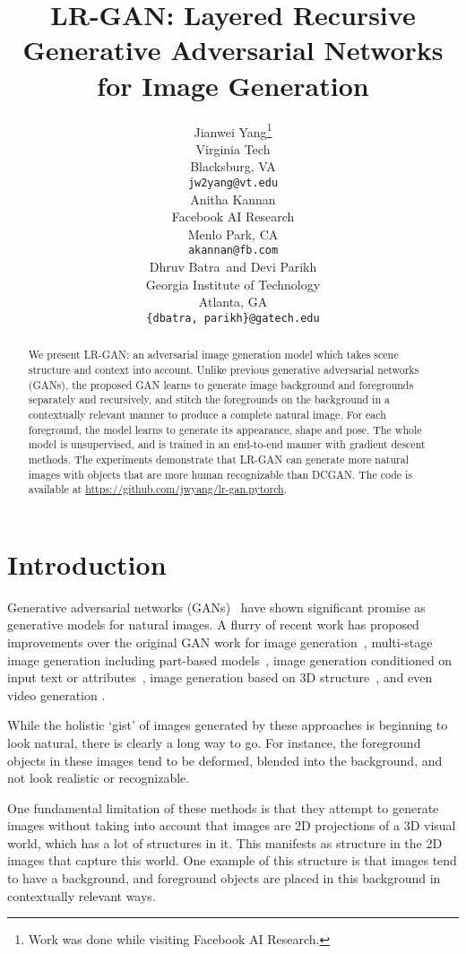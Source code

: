 \documentclass{article} \usepackage{iclr2017_conference,times}
\title{LR-GAN: Layered Recursive Generative Adversarial Networks for Image Generation}
\author{Jianwei Yang\thanks{Work was done while visiting Facebook AI Research.} \\
Virginia Tech \\ 
Blacksburg, VA \\
\texttt{jw2yang@vt.edu} \\
\And
Anitha Kannan \\
Facebook AI Research \\
Menlo Park, CA \\
\texttt{akannan@fb.com} \\
\And
Dhruv Batra\footnotemark[1] \ and Devi Parikh\footnotemark[1] \\
Georgia Institute of Technology  \\
Atlanta, GA \\
\texttt{\{dbatra, parikh\}@gatech.edu}
}
\begin{document}
\maketitle

\begin{abstract}



We present LR-GAN: an adversarial image generation model which takes scene structure and context into account. Unlike previous generative adversarial networks (GANs), the proposed GAN learns to generate image background and foregrounds separately and recursively, and stitch the foregrounds on the background in a contextually relevant manner to produce a complete natural image. For each foreground, the model learns to generate its appearance, shape and pose. The whole model is unsupervised, and is trained in an end-to-end manner with gradient descent methods. The experiments demonstrate that LR-GAN can generate more natural images with objects that are more human recognizable than DCGAN. The code is available at \url{https://github.com/jwyang/lr-gan.pytorch}.
\end{abstract}

\section{Introduction}
\vspace*{-7pt}
Generative adversarial networks (GANs)~\citep{GAN} have shown significant promise 
as generative models for natural images. A flurry of recent work has proposed improvements over the original GAN work for 
image generation~\citep{DCGAN, LAPGAN, ImprovedGAN, InfoGAN, ManipulateGAN, EBGAN}, multi-stage image generation including part-based models~\citep{GRAN, CompositeGAN}, image generation conditioned on input text or attributes~\citep{CapGAN, Text2ImgGAN, WWGAN}, image generation based on 3D structure~\citep{StyleGAN}, and even video generation \citep{VideoGAN}.

While the holistic `gist' of images generated by these approaches is beginning to look natural, 
there is clearly a long way to go. 
For instance, the foreground objects in these images tend to be 
deformed, blended into the background, and not look realistic or recognizable. 


One fundamental limitation of these methods is that they attempt to generate images without taking into account that images are 2D projections of a 3D visual world, which has a lot of structures in it. This manifests as structure in the 2D images that capture this world. One example of this structure is that images tend to have a background, and foreground objects are placed in this background in contextually relevant ways.
\end{document}
